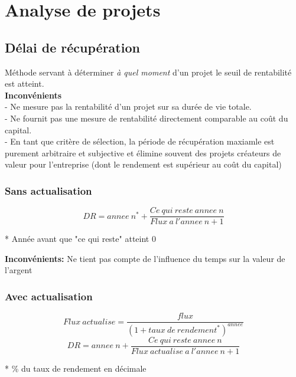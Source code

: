 \section{Analyse de projets}

\subsection{Délai de récupération}
 Méthode servant à déterminer \textit{à quel moment} d'un projet le seuil de rentabilité est atteint.\\

    \textbf{Inconvénients}\\
        - Ne mesure pas la rentabilité d'un projet sur sa durée de vie totale.\\
        - Ne fournit pas une mesure de rentabilité directement comparable au coût du capital.\\
        - En tant que critère de sélection, la période de récupération maxiamle est purement arbitraire et subjective et élimine souvent des projets créateurs de valeur pour l'entreprise (dont le rendement est supérieur au coût du capital)
    \subsubsection{Sans actualisation}
    \begin{RoundBox}
        $$DR=annee\ n^* +\frac{Ce\ qui\ reste\ annee\ n}{Flux\ a\ l'annee\ n+1}$$
        \begin{footnotesize}
            * Année avant que "ce qui reste" atteint 0
        \end{footnotesize}
    \end{RoundBox}
    \textbf{Inconvénients:} Ne tient pas compte de l’influence du temps sur la valeur de l’argent

\subsubsection{Avec actualisation}
    \begin{RoundBox}
    $$Flux\ actualise = \frac{flux}{(1 + taux\ de\ rendement^*)^{annee}}$$
    $$DR=annee\ n +\frac{Ce\ qui\ reste\ annee\ n}{Flux\ actualise\ a\ l'annee\ n+1}$$
    \begin{footnotesize}
    * \% du taux de rendement en décimale
    \end{footnotesize}
    \end{RoundBox}


